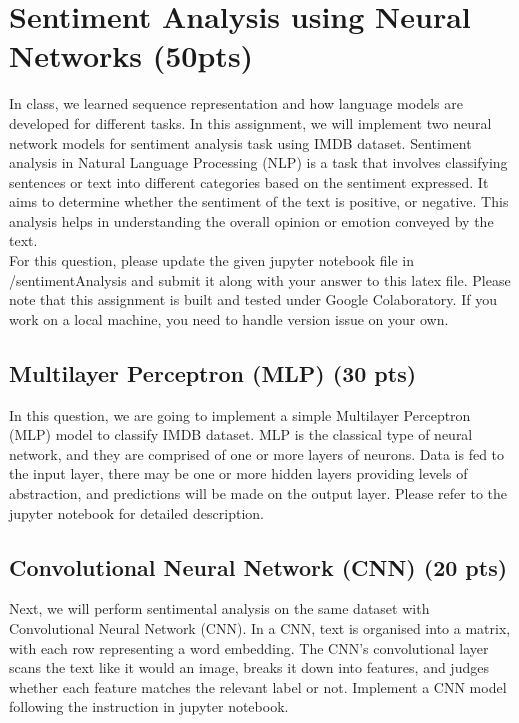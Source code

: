 \documentclass{assignment format}
\begin{document}
\section{Sentiment Analysis using Neural Networks (50pts)}

In class, we learned sequence representation and how language models are developed for different tasks. In this assignment, we will implement two neural network models for sentiment analysis task using IMDB dataset. Sentiment analysis in Natural Language Processing (NLP) is a task that involves classifying sentences or text into different categories based on the sentiment expressed. It aims to determine whether the sentiment of the text is positive, or negative. This analysis helps in understanding the overall opinion or emotion conveyed by the text.\\
For this question, please update the given jupyter notebook file in /sentimentAnalysis and submit it along with your answer to this latex file. Please note that this assignment is built and tested under Google Colaboratory. If you work on a local machine, you need to handle version issue on your own. 
\subsection{Multilayer Perceptron (MLP) (30 pts)}
In this question, we are going to implement a simple Multilayer Perceptron (MLP) model to classify IMDB dataset. MLP is the classical type of neural network, and they are comprised of one or more layers of neurons. Data is fed to the input layer, there may be one or more hidden layers providing levels of abstraction, and predictions will be made on the output layer. Please refer to the jupyter notebook for detailed description.
\subsection{Convolutional Neural Network (CNN) (20 pts)}
Next, we will perform sentimental analysis on the same dataset with Convolutional Neural Network (CNN). In a CNN, text is organised into a matrix, with each row representing a word embedding. The CNN’s convolutional layer scans the text like it would an image, breaks it down into features, and judges whether each feature matches the relevant label or not. Implement a CNN model following the instruction in jupyter notebook.
\end{document}
